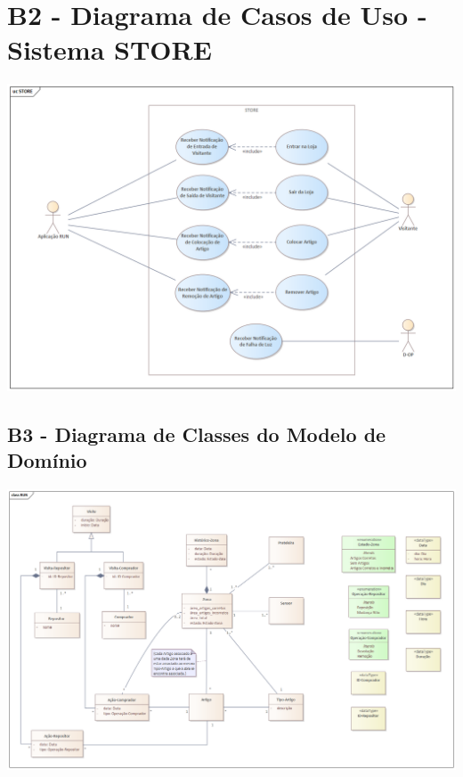 \documentclass{article}
\begin{document}
\section*{B2 - Diagrama de Casos de Uso - Sistema STORE}
\vspace*{\fill}
\begin{center}
	\includegraphics[width=\textwidth,height=\textheight,keepaspectratio]{B2-STORE}
\end{center}
\vspace*{\fill}

\pagebreak

\begin{landscape}
	\section*{B3 - Diagrama de Classes do Modelo de Domínio}
	\vspace*{\fill}
	\begin{center}
		\includegraphics[width=1.45\textheight,height=\textwidth,keepaspectratio]{B3}
	\end{center}
	\vspace*{\fill}
\end{landscape}
\end{document}
